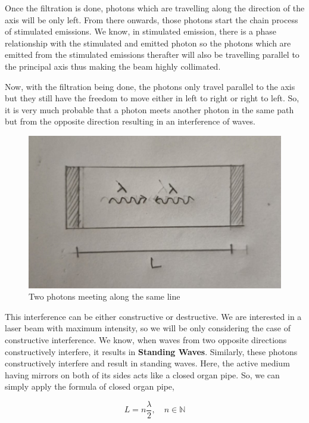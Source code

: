 \documentclass[12pt]{article}
\begin{document}
Once the filtration is done, photons which are travelling along the direction of the axis will be only left. From there onwards, those photons start the chain process of stimulated emissions. We know, in stimulated emission, there is a phase relationship with the stimulated and emitted photon so the photons which are emitted from the stimulated emissions therafter will also be travelling parallel to the principal axis thus making the beam highly collimated. \vspace{.2cm}

Now, with the filtration being done, the photons only travel parallel to the axis but they still have the freedom to move either in left to right or right to left. So, it is very much probable that a photon meets another photon in the same path but from the opposite direction resulting in an interference of waves. \vspace{.2cm}

\begin{figure}[H]
    \centering
    \includegraphics[scale=.8]{./img/13_meeting_waves.png}
    \caption{Two photons meeting along the same line}
\end{figure}

This interference can be either constructive or destructive. We are interested in a laser beam with maximum intensity, so we will be only considering the case of constructive interference. We know, when waves from two opposite directions constructively interfere, it results in \textbf{Standing Waves}. Similarly, these photons constructively interfere and result in standing waves. Here, the active medium having mirrors on both of its sides acts like a closed organ pipe. So, we can simply apply the formula of closed organ pipe, \vspace{.2cm}

\begin{equation}
    L = n\frac{\lambda}{2}, \quad n \in \mathbb{N}
\end{equation}
\end{document}
